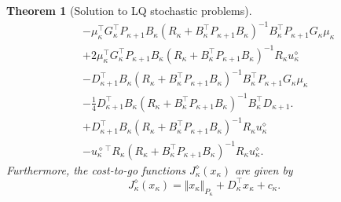 \documentclass[10pt]{IEEEtran}      %
\theoremstyle{theorem}
\newtheorem{theo}{Theorem}
\theoremstyle{remark}
\begin{document}
\begin{theo}[Solution to LQ stochastic problems]
\begin{subequations}
\begin{align}
&\nonumber -\mu_\kappa^\top G_\kappa^\top P_{\kappa+1} B_\kappa (R_\kappa+B_\kappa^\top P_{\kappa+1}B_\kappa)^{-1} B_\kappa^\top P_{\kappa+1} G_\kappa\mu_\kappa\\
&\nonumber +2\mu_\kappa^\top G_\kappa^\top P_{\kappa+1} B_\kappa (R_\kappa+B_\kappa^\top P_{\kappa+1}B_\kappa)^{-1} R_\kappa u_\kappa^\diamond\\
&\nonumber - D_{\kappa+1}^\top B_\kappa (R_\kappa+B_\kappa^\top P_{\kappa+1}B_\kappa)^{-1}B_\kappa^\top P_{\kappa+1}G_\kappa \mu_\kappa\\ 
&\nonumber -\tfrac{1}{4}D_{\kappa+1}^\top B_\kappa (R_\kappa+B_\kappa^\top P_{\kappa+1}B_\kappa)^{-1}B_\kappa^\top D_{\kappa+1}.\\
&\nonumber +D_{\kappa+1}^\top B_\kappa (R_\kappa+B_\kappa^\top P_{\kappa+1}B_\kappa)^{-1}R_\kappa u_\kappa^\diamond\\
&-u_\kappa^{\diamond\,\top}R_\kappa (R_\kappa+B_\kappa^\top P_{\kappa+1}B_\kappa)^{-1}R_\kappa u_\kappa^\diamond.
\end{align}
\label{eq:quadRicc}%
\end{subequations}
Furthermore, the cost-to-go functions $J_\kappa^\diamond(x_\kappa)$ are given by
\begin{equation}\label{eq:ctg}
J_\kappa^\diamond(x_\kappa)= \Vert x_\kappa \Vert_{P_\kappa} + D_\kappa^\top x_\kappa + c_\kappa.
\end{equation}
\end{theo}
\end{document}

